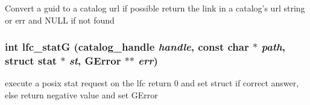 Convert a guid to a catalog url if possible return the link in a catalog's url string or err and NULL if not found 
\subsubsection{\setlength{\rightskip}{0pt plus 5cm}int lfc\_\-stat\-G (catalog\_\-handle {\em handle}, const char $\ast$ {\em path}, struct stat $\ast$ {\em st}, GError $\ast$$\ast$ {\em err})}\label{gfal__common__lfc_8c_51eb57986d959b753dbad4737f3e1b6f}


execute a posix stat request on the lfc return 0 and set struct if correct answer, else return negative value and set GError 